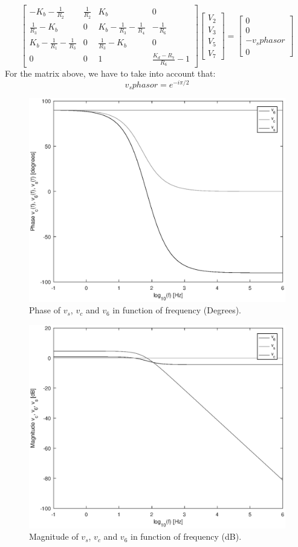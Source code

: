 $$ \left[ \begin{array}{cccc} - K_b -\frac{1}{R_2}  & \frac{1}{R_2} & K_b & 0 \\
\frac{1}{R_3} - K_b & 0 & K_b -\frac{1}{R_3}-\frac{1}{R_4} & -\frac{1}{R_6} \\
K_b-\frac{1}{R_1}-\frac{1}{R_3} & 0 & \frac{1}{R_3}-K_b & 0 
\\ 0 & 0 & 1 & \frac{K_d - R_7}{R_6}-1\end{array} \right]
\left[ \begin{array}{c} V_2 \\ V_3 \\ V_5 \\ V_7 \end{array} \right] = 
\left[ \begin{array}{c} 0 \\ 0 \\ -v_sphasor \\ 0 \end{array} \right] $$
For the matrix above, we have to take into account that:
\begin{equation}
v_sphasor = e^{-i\pi/2}
\label{eq:vsphasor}
\end{equation}

\begin{figure}[h!] \centering
\includegraphics[width=0.8\linewidth]{Phase(degrees).eps}
\caption{Phase of $v_s$, $v_c$ and $v_6$ in function of frequency (Degrees).}
\label{fig:phase}
\end{figure}

\begin{figure}[h!] \centering
\includegraphics[width=0.8\linewidth]{MagnitudedB.eps}
\caption{Magnitude of $v_s$, $v_c$ and $v_6$ in function of frequency (dB).}
\label{fig:magnitude}
\end{figure}

